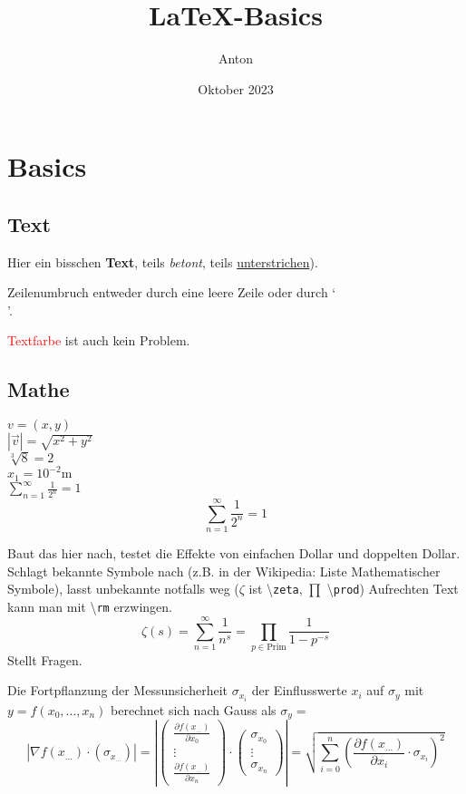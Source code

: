 \documentclass{article}
\title{\LaTeX{}-Basics}
\author{Anton}
\date{Oktober 2023}
\begin{document}
\maketitle

\section{Basics}
\subsection{Text}
Hier ein bisschen
\textbf{Text},
teils \emph{betont},
teils \underline
{unterstrichen}).

Zeilenumbruch entweder
durch eine leere Zeile
oder durch `\\'.

\textcolor{red}{Textfarbe}
ist auch kein
{\color{blue} Problem}.

\subsection{Mathe}
$ v = (x, y) $ \\
$ |\vec{v}| = \sqrt{x^2 + y^2} $ \\
$ \sqrt[3]{8} = 2 $ \\
$ x_1 = 10^{-2}\text{m} $ \\
$ \sum_{n=1}^\infty \frac{1}{2^n} = 1 $ \\
$$ \sum_{n=1}^\infty \frac{1}{2^n} = 1 $$


Baut das hier nach, testet die Effekte von einfachen Dollar und doppelten Dollar. Schlagt bekannte Symbole nach (z.B. in der Wikipedia: Liste Mathematischer Symbole), lasst unbekannte notfalls weg ($\zeta$ ist \textbackslash\lstinline+zeta+, $\prod$ \textbackslash\lstinline+prod+) Aufrechten Text kann man mit \textbackslash\lstinline+rm+ erzwingen.
$$ \zeta(s)
	= \sum_{n=1}^\infty \frac{1}{n^s}
	= \prod_{p \in \text{Prim}} \frac{1}{1-p^{-s}}
$$
Stellt Fragen.

Die Fortpflanzung der Messunsicherheit $\sigma_{x_i}$ der Einflusswerte $x_i$ auf $\sigma_y$ mit $y = f(x_0, ..., x_n)$ berechnet sich nach {\sc Gauss} als $\sigma_y = $
$$ |\nabla f(x_{...}) \cdot (\sigma_{x_{...}})| =
\left|
	\begin{pmatrix} \frac{\partial f(x_{...})}{\partial x_0} \\ \vdots \\ \frac{\partial f(x_{...})}{\partial x_n} \end{pmatrix} \cdot
	\begin{pmatrix} \sigma_{x_0} \\ \vdots \\ \sigma_{x_n} \end{pmatrix}
\right| = \sqrt{\sum_{i=0}^n {\left(\frac{\partial f(x_{...})}{\partial x_i} \cdot \sigma_{x_i}\right)}^2} $$
\end{document}
